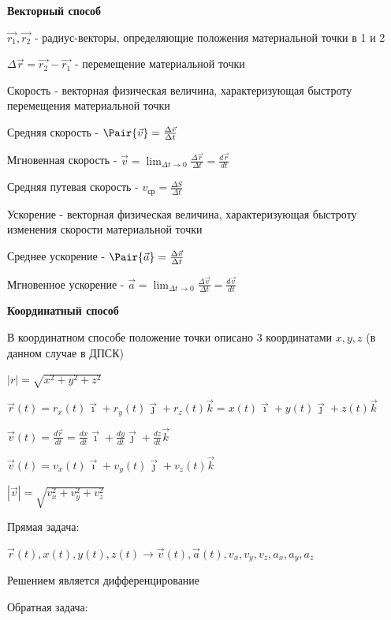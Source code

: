 \documentclass[12pt]{article}
\begin{document}
    \textbf{Векторный способ}

    $\vec{r_1}, \vec{r_2}$ - радиус-векторы, определяющие положения материальной точки в 1 и 2

    $\Delta \vec{r} = \vec{r_2} - \vec{r_1}$ - перемещение материальной точки

    \Def Скорость - векторная физическая величина, характеризующая быстроту перемещения материальной точки

    Средняя скорость - $\Pair{\vec{v}} = \frac{\Delta \vec{r}}{\Delta t}$

    Мгновенная скорость - $\vec{v} = \lim_{\Delta t \to 0} \frac{\Delta \vec{r}}{\Delta t} = \frac{d \vec{r}}{dt}$

    Средняя путевая скорость - $v_{\text{ср}} = \frac{\Delta S}{\Delta t}$

    \Def Ускорение - векторная физическая величина, характеризующая быстроту изменения скорости материальной точки

    Среднее ускорение - $\Pair{\vec{a}} = \frac{\Delta \vec{v}}{\Delta t}$

    Мгновенное ускорение - $\vec{a} = \lim_{\Delta t \to 0} \frac{\Delta \vec{v}}{\Delta t} = \frac{d \vec{v}}{dt}$


    \textbf{Координатный способ}

    В координатном способе положение точки описано 3 координатами $x, y, z$ (в данном случае в ДПСК)

    $|r| = \sqrt{x^2 + y^2 + z^2}$

    $\vec{r} (t) = r_x (t) \vec{\imath} + r_y (t) \vec{\jmath} + r_z (t) \vec{k} = x(t) \vec{\imath} + y(t) \vec{\jmath} + z(t) \vec{k}$

    $\vec{v} (t) = \frac{d \vec{r}}{dt} = \frac{dx}{dt} \vec{\imath} + \frac{dy}{dt} \vec{\jmath} + \frac{dz}{dt} \vec{k}$

    $\vec{v} (t) = v_x(t)\vec{\imath} + v_y(t) \vec{\jmath} + v_z(t) \vec{k}$

    $|\vec{v}| = \sqrt{v_x^2 + v_y^2 + v_z^2}$



    Прямая задача:

    $\vec{r}(t), x(t), y(t), z(t) \longrightarrow \vec{v}(t), \vec{a}(t), v_x, v_y, v_z, a_x, a_y, a_z$

    Решением является дифференцирование

    Обратная задача:
\end{document}
